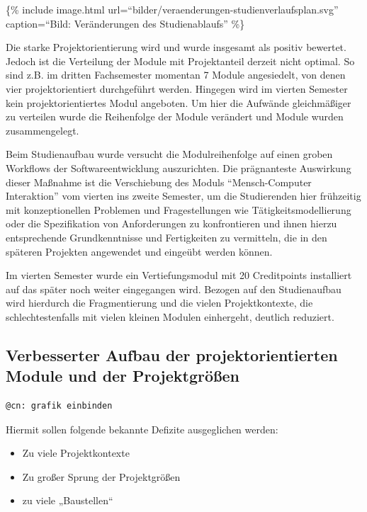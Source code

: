 \{\% include image.html
url=``bilder/veraenderungen-studienverlaufsplan.svg'' caption=``Bild:
Veränderungen des Studienablaufs'' \%\}

Die starke Projektorientierung wird und wurde insgesamt als positiv
bewertet. Jedoch ist die Verteilung der Module mit Projektanteil derzeit
nicht optimal. So sind z.B. im dritten Fachsemester momentan 7 Module
angesiedelt, von denen vier projektorientiert durchgeführt werden.
Hingegen wird im vierten Semester kein projektorientiertes Modul
angeboten. Um hier die Aufwände gleichmäßiger zu verteilen wurde die
Reihenfolge der Module verändert und Module wurden zusammengelegt.

Beim Studienaufbau wurde versucht die Modulreihenfolge auf einen groben
Workflows der Softwareentwicklung auszurichten. Die prägnanteste
Auswirkung dieser Maßnahme ist die Verschiebung des Moduls
``Mensch-Computer Interaktion'' vom vierten ins zweite Semester, um die
Studierenden hier frühzeitig mit konzeptionellen Problemen und
Fragestellungen wie Tätigkeitsmodellierung oder die Spezifikation von
Anforderungen zu konfrontieren und ihnen hierzu entsprechende
Grundkenntnisse und Fertigkeiten zu vermitteln, die in den späteren
Projekten angewendet und eingeübt werden können.

Im vierten Semester wurde ein Vertiefungsmodul mit 20 Creditpoints
installiert auf das später noch weiter eingegangen wird. Bezogen auf den
Studienaufbau wird hierdurch die Fragmentierung und die vielen
Projektkontexte, die schlechtestenfalls mit vielen kleinen Modulen
einhergeht, deutlich reduziert.

\subsection{Verbesserter Aufbau der projektorientierten Module und
der
Projektgrößen}\label{verbesserter-aufbau-der-projektorientierten-module-und-der-projektgruxf6uxdfen}

\begin{verbatim}
@cn: grafik einbinden
\end{verbatim}

Hiermit sollen folgende bekannte Defizite ausgeglichen werden:

\begin{itemize}
\tightlist
\item
  Zu viele Projektkontexte
\item
  Zu großer Sprung der Projektgrößen
\item
  zu viele „Baustellen``
\end{itemize}

